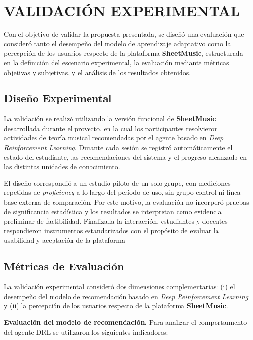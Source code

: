 \section{VALIDACIÓN EXPERIMENTAL}

Con el objetivo de validar la propuesta presentada, se diseñó una evaluación que consideró tanto el desempeño del modelo de aprendizaje adaptativo como la percepción de los usuarios respecto de la plataforma \textbf{SheetMusic}, estructurada en la definición del escenario experimental, la evaluación mediante métricas objetivas y subjetivas, y el análisis de los resultados obtenidos.

\subsection{Diseño Experimental}

La validación se realizó utilizando la versión funcional de \textbf{SheetMusic} desarrollada durante el proyecto, en la cual los participantes resolvieron actividades de teoría musical recomendadas por el agente basado en \textit{Deep Reinforcement Learning}. Durante cada sesión se registró automáticamente el estado del estudiante, las recomendaciones del sistema y el progreso alcanzado en las distintas unidades de conocimiento.

El diseño correspondió a un estudio piloto de un solo grupo, con mediciones repetidas de \textit{proficiency} a lo largo del período de uso, sin grupo control ni línea base externa de comparación. Por este motivo, la evaluación no incorporó pruebas de significancia estadística y los resultados se interpretan como evidencia preliminar de factibilidad. Finalizada la interacción, estudiantes y docentes respondieron instrumentos estandarizados con el propósito de evaluar la usabilidad y aceptación de la plataforma.

\subsection{Métricas de Evaluación}

La validación experimental consideró dos dimensiones complementarias: (i) el desempeño del modelo de recomendación basado en \textit{Deep Reinforcement Learning} y (ii) la percepción de los usuarios respecto de la plataforma \textbf{SheetMusic}.

\textbf{Evaluación del modelo de recomendación.} Para analizar el comportamiento del agente DRL se utilizaron los siguientes indicadores:


